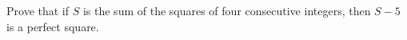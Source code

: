 Prove that if $S$ is the sum of the squares of four consecutive integers, then $S-5$ is a perfect square.
